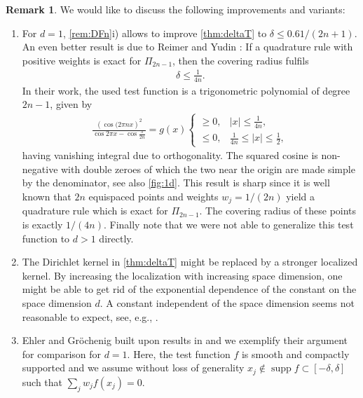 \documentclass[11pt,a4paper,twoside,final,biblatex]{scrartcl}
\newcommand{\T}{\ensuremath{\mathbb{T}}}
\renewcommand{\d}{\,\mathrm{d}}
\newcommand{\supp}{\operatorname{supp}}
\theoremstyle{definition}
\newtheorem{remark}[theorem]{Remark}
\numberwithin{equation}{section}
\numberwithin{table}{section}
\numberwithin{figure}{section}
\begin{document}
\begin{remark}\label{rem:Improv}
We would like to discuss the following improvements and variants:
\begin{enumerate}
  \item For $d=1$, \cref{rem:DFn}i) allows to improve \cref{thm:deltaT} to $\delta\le 0.61/(2n+1)$. An even better result is due to Reimer and Yudin \cite[Thm.~6.21]{Re03}:
 If a quadrature rule with positive weights is exact for $\Pi_{2n-1}$, then the covering radius fulfils
 \begin{align*}
     \delta\le \frac{1}{4n}.
 \end{align*}
 In their work, the used test function is a trigonometric polynomial of degree $2n-1$, given by
 \begin{align*}
  \frac{\left(\cos(2\pi n x\right)^2}{\cos 2\pi x - \cos \frac{\pi}{2n}}=g(x)
  \begin{cases}
   \ge 0, & |x|\le \frac{1}{4n},\\
   \le 0, & \frac{1}{4n}\le|x|\le\frac12,
  \end{cases}
 \end{align*}
 having vanishing integral due to orthogonality. The squared cosine is non-negative with double zeroes of which the two near the origin are made simple by the denominator, see also \cref{fig:1d}.
 This result is sharp since it is well known that $2n$ equispaced points and weights $w_j=1/(2n)$ yield a quadrature rule which is exact for $\Pi_{2n-1}$. The covering radius of these points is exactly $1/(4n)$.
 Finally note that we were not able to generalize this test function to $d> 1$ directly.
\item The Dirichlet kernel in \cref{thm:deltaT} might be replaced by a stronger localized kernel. %
By increasing the localization with increasing space dimension, one might be able to get rid of the exponential dependence of the constant on the space dimension $d$. A constant independent of the space dimension seems not reasonable to expect, see, e.g., \cite{CaElGoKe22,CoDoGo24}.%
 \item Ehler and Gröchenig \cite[Thm.~2.2]{EhGr23} built upon results in \cite{BaChCoGiSeTr14,BrEhGr18} and we exemplify their argument for comparison for $d=1$.
 Here, the test function $f$ is smooth and compactly supported and we assume without loss of generality $x_j\not\in\supp f\subset [-\delta,\delta]$ such that $\sum_j w_j f(x_j)=0$.

\end{enumerate}
\end{remark}
\end{document}
